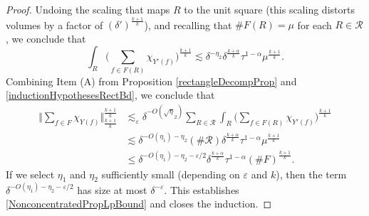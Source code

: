 \documentclass[letterpaper, reqno,11pt]{article}
\numberwithin{equation}{section}
\newcommand{\eps}{\varepsilon}
\numberwithin{thm}{section}
\theoremstyle{remark}
\begin{document}
\begin{proof}
Undoing the scaling that maps $R$ to the unit square (this scaling distorts volumes by a factor of $(\delta')^{\frac{k+1}{k}}$), and recalling that $\#F(R)=\mu$ for each $R\in\mathcal{R}$, we conclude that
\begin{equation}\label{inductionHypothesesRectBd}
\int_R \Big( \sum_{f\in  F(R) }\chi_{Y'(f)}  \Big)^{\frac{k+1}{k}} \lesssim 
 \delta^{-\eta_2}\delta^{\frac{k+\alpha}{k}}\tau^{1-\alpha} \mu^{\frac{k+1}{k}}.
\end{equation}
Combining Item (A) from Proposition \ref{rectangleDecompProp} and \eqref{inductionHypothesesRectBd}, we conclude that 
%
\begin{equation}\label{controlOFLkNormInductionClose}
\begin{split}
\Big \Vert \sum_{f\in F}\chi_{Y(f)}\Big\Vert_{\frac{k+1}{k}}^{\frac{k+1}{k}} & \lesssim_\eps \delta^{-O(\sqrt\eta_2)}\sum_{R\in\mathcal{R}} \int_{R}\Big(\sum_{f\in F(R)}\chi_{Y'(f)}\Big)^{\frac{k+1}{k}}\\
& \lesssim  \delta^{-O(\eta_1)-\eta_2}(\#\mathcal{R})\delta^{\frac{k+\alpha}{k}}\tau^{1-\alpha} \mu^{\frac{k+1}{k}}\\
& \leq \delta^{-O(\eta_1)-\eta_2-\eps/2}\delta^{\frac{k+\alpha}{k}}\tau^{1-\alpha} (\# F)^{\frac{k+1}{k}}.
\end{split}
\end{equation} 
If we select $\eta_1$ and $\eta_2$ sufficiently small (depending on $\eps$ and $k$), then the term $\delta^{-O(\eta_1)-\eta_2-\eps/2}$ has size at most $\delta^{-\eps}$. This establishes \eqref{NonconcentratedPropLpBound} and closes the induction. 
\end{proof}


\end{document}
